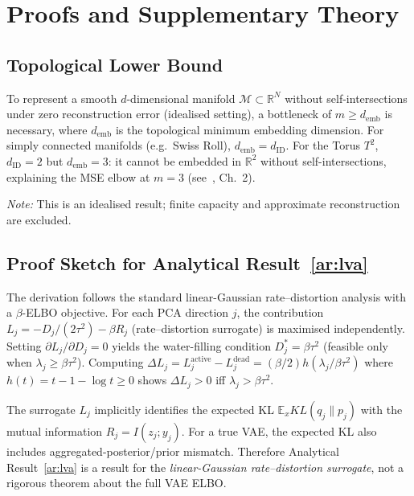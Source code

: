\documentclass[make,article,submit,pdftex,moreauthors]{Definitions/mdpi}
\newcommand{\dID}{d_{\mathrm{ID}}}
\newcommand{\R}{\mathbb{R}}
\newcommand{\demb}{d_{\mathrm{emb}}}
\begin{document}
\section{Proofs and Supplementary Theory}\label{app:proofs}

\subsection{Topological Lower Bound}\label{app:lower_bound}

\begin{proposition}
To represent a smooth $d$-dimensional manifold $\mathcal{M}\subset\R^N$
without self-intersections under zero reconstruction error (idealised setting),
a bottleneck of $m\geq\demb$ is necessary, where $\demb$ is the topological
minimum embedding dimension.
For simply connected manifolds (e.g.\ Swiss Roll), $\demb=\dID$.
For the Torus $T^2$, $\dID=2$ but $\demb=3$: it cannot be embedded in $\R^2$
without self-intersections, explaining the MSE elbow at $m=3$
(see~\cite{hatcher2002algebraic}, Ch.~2).
\end{proposition}

\noindent
\textit{Note:} This is an idealised result; finite capacity and approximate
reconstruction are excluded.

\subsection{Proof Sketch for Analytical Result~\ref{ar:lva}}\label{app:linear_vae_proof}

The derivation follows the standard linear-Gaussian rate--distortion analysis
with a $\beta$-ELBO objective.  For each PCA direction $j$, the contribution
$L_j = -D_j/(2\tau^2) - \beta R_j$ (rate--distortion surrogate) is maximised
independently.
Setting $\partial L_j/\partial D_j=0$ yields the water-filling condition
$D_j^*=\beta\tau^2$ (feasible only when $\lambda_j\geq\beta\tau^2$).
Computing $\Delta L_j = L_j^{\mathrm{active}}-L_j^{\mathrm{dead}}
= (\beta/2)h(\lambda_j/\beta\tau^2)$ where $h(t)=t-1-\log t\geq0$
shows $\Delta L_j>0$ iff $\lambda_j>\beta\tau^2$.

\begin{remark}
The surrogate $L_j$ implicitly identifies the expected KL $\mathbb{E}_xKL(q_j\|p_j)$
with the mutual information $R_j=I(z_j;y_j)$.
For a true VAE, the expected KL also includes aggregated-posterior/prior mismatch.
Therefore Analytical Result~\ref{ar:lva} is a result for the \emph{linear-Gaussian
rate--distortion surrogate}, not a rigorous theorem about the full VAE ELBO.
\end{remark}
\end{document}
